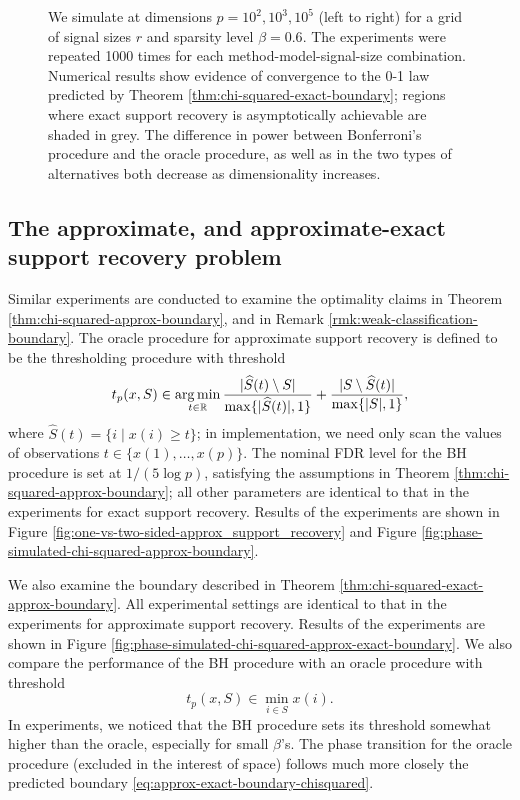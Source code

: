 \begin{figure}
{      We simulate at dimensions $p=10^2, 10^3, 10^5$ (left to right) for a grid of signal sizes $r$ and sparsity level $\beta=0.6$.
      The experiments were repeated 1000 times for each method-model-signal-size combination. 
      Numerical results show evidence of convergence to the 0-1 law predicted by Theorem \ref{thm:chi-squared-exact-boundary}; regions where exact support recovery is asymptotically achievable are shaded in grey.
      The difference in power between Bonferroni's procedure and the oracle procedure, as well as in the two types of alternatives both decrease as dimensionality increases.} 
      \label{fig:one-vs-two-sided-exact_support_recovery}
\end{figure}

\subsection{The approximate, and approximate-exact support recovery problem}

Similar experiments are conducted to examine the optimality claims in Theorem \ref{thm:chi-squared-approx-boundary}, and in Remark \ref{rmk:weak-classification-boundary}.
The oracle procedure for approximate support recovery is defined to be the thresholding procedure with threshold
$$
t_p(x, S) \in \operatorname*{arg\,min}_{t\in\mathbb R} \frac{|\widehat{S}(t)\setminus S|}{\max\{|\widehat{S}(t)|,1\}} + \frac{|S\setminus \widehat{S}(t)|}{\max\{|{S}|,1\}},
$$
where $\widehat{S}(t) = \{i\;|\;x(i)\ge t\}$;
in implementation, we need only scan the values of observations $t\in\{x(1), \ldots, x(p)\}$. 
The nominal FDR level for the BH procedure is set at $1/(5{\log{p}})$, satisfying the assumptions in Theorem \ref{thm:chi-squared-approx-boundary}; all other parameters are identical to that in the experiments for exact support recovery.
Results of the experiments are shown in Figure \ref{fig:one-vs-two-sided-approx_support_recovery} and Figure \ref{fig:phase-simulated-chi-squared-approx-boundary}.

We also examine the boundary described in Theorem \ref{thm:chi-squared-exact-approx-boundary}.
All experimental settings are identical to that in the experiments for approximate support recovery.
Results of the experiments are shown in Figure \ref{fig:phase-simulated-chi-squared-approx-exact-boundary}.
We also compare the performance of the BH procedure with an oracle procedure with threshold
$$
t_p(x, S) \in \min_{i\in S} x(i).
$$
In experiments, we noticed that the BH procedure sets its threshold somewhat higher than the oracle, especially for small $\beta$'s. 
The phase transition for the oracle procedure (excluded in the interest of space) follows much more closely the predicted boundary \eqref{eq:approx-exact-boundary-chisquared}.

